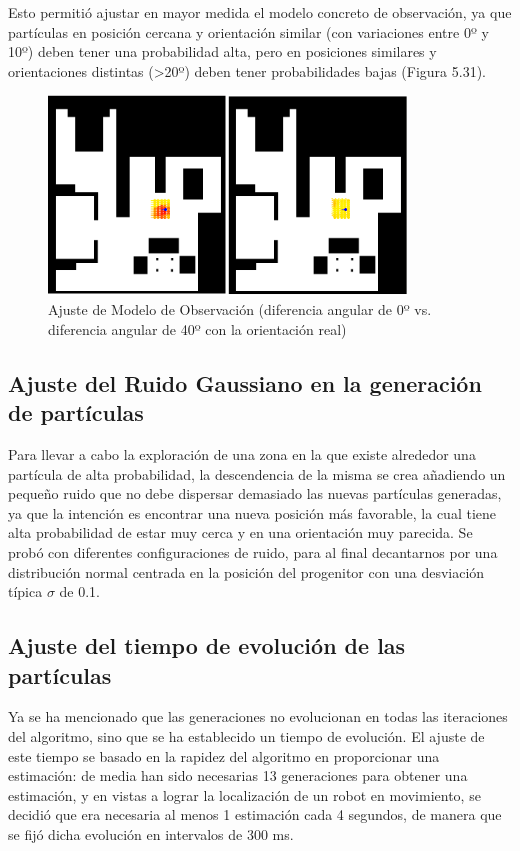 Esto permitió ajustar en mayor medida el modelo concreto de observación, ya que partículas en posición cercana y orientación similar (con variaciones entre 0º y 10º) deben tener una probabilidad alta, pero en posiciones similares y orientaciones distintas (>20º) deben tener probabilidades bajas (Figura 5.31).

\begin{figure}[H]
		\begin{center}
		\includegraphics[width=0.85\textwidth]{figures/slidermap.png}
		\caption{Ajuste de Modelo de Observación (diferencia angular de 0º vs. diferencia angular de 40º con la orientación real)}
		\label{fig.slidermap}
		\end{center}
	\end{figure}
	
\subsection{Ajuste del Ruido Gaussiano en la generación de partículas}
Para llevar a cabo la exploración de una zona en la que existe alrededor una partícula de alta probabilidad, la descendencia de la misma se crea añadiendo un pequeño ruido que no debe dispersar demasiado las nuevas partículas generadas, ya que la intención es encontrar una nueva posición más favorable, la cual tiene alta probabilidad de estar muy cerca y en una orientación muy parecida. Se probó con diferentes configuraciones de ruido, para al final decantarnos por una distribución normal centrada en la posición del progenitor con una desviación típica $\sigma$ de 0.1.

\subsection{Ajuste del tiempo de evolución de las partículas}
Ya se ha mencionado que las generaciones no evolucionan en todas las iteraciones del algoritmo, sino que se ha establecido un tiempo de evolución. El ajuste de este tiempo se basado en la rapidez del algoritmo en proporcionar una estimación: de media han sido necesarias 13 generaciones para obtener una estimación, y en vistas a lograr la localización de un robot en movimiento, se decidió que era necesaria al menos 1 estimación cada 4 segundos, de manera que se fijó dicha evolución en intervalos de 300 ms. 

